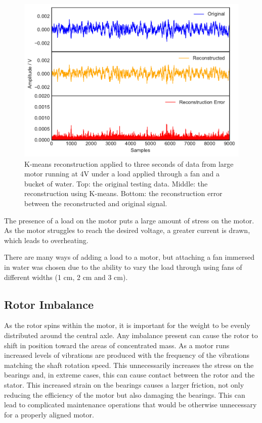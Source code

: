 \begin{figure}[t]
    \includegraphics[width=1.0\textwidth]{fig/kmeans_large_4Vwater.pdf}
    \caption[K-means Large Motor Reconstruction In Water]{K-means reconstruction applied to three seconds of data from large motor running at 4V under a load applied through a fan and a bucket of water. Top: the original testing data. Middle: the reconstruction using K-means. Bottom: the reconstruction error between the reconstructed and original signal.}
    \label{fig:kmeans_large4Vwater}
\end{figure}

The presence of a load on the motor puts a large amount of stress on the motor. As the motor struggles to reach the desired voltage, a greater current is drawn, which leads to overheating.

        
There are many ways of adding a load to a motor, but attaching a fan immersed in water was chosen due to the ability to vary the load through using fans of different widths (1 cm, 2 cm and 3 cm).
    
\subsection{Rotor Imbalance}
As the rotor spins within the motor, it is important for the weight to be evenly distributed around the central axle. Any imbalance present can cause the rotor to shift in position toward the areas of concentrated mass. As a motor runs increased levels of vibrations are produced with the frequency of the vibrations matching the shaft rotation speed. This unnecessarily increases the stress on the bearings and, in extreme cases, this can cause contact between the rotor and the stator. This increased strain on the bearings causes a larger friction, not only reducing the efficiency of the motor but also damaging the bearings. This can lead to complicated maintenance operations that would be otherwise unnecessary for a properly aligned motor.

